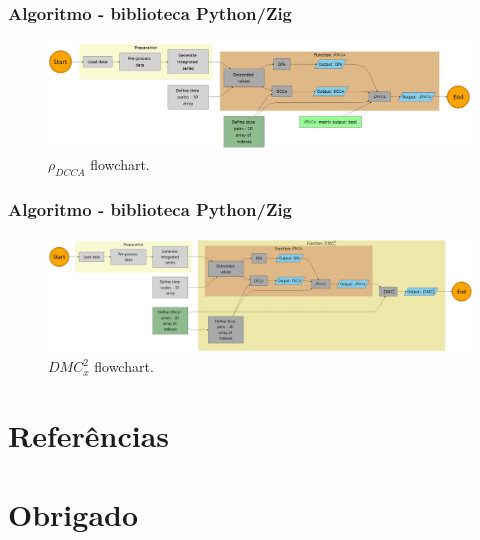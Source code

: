 \documentclass[11pt, aspectratio=169]{beamer}
\newcommand{\dmc}{\(DMC_x^2\) }
\newcommand{\pdcca}{\({\rho}_{DCCA}\) }
\begin{document}
\begin{frame}
  \frametitle{Algoritmo - biblioteca Python/Zig}

  \begin{figure}[!h]
    \includegraphics[width=.8\paperwidth]{../Figures/pylib/pdcca_chart.png}
    \caption{\pdcca flowchart.}
    \label{chart_01}
  \end{figure}


\end{frame}

\begin{frame}
  \frametitle{Algoritmo - biblioteca Python/Zig}

  \begin{figure}[!h]
    \includegraphics[width=.8\paperwidth]{../Figures/pylib/dmc_chart.png}
    \caption{\dmc flowchart.}
    \label{chart_02}
  \end{figure}


\end{frame}



\section{Referências}

\begin{frame}[allowframebreaks]

  

\end{frame}

\section*{Obrigado}
\end{document}
